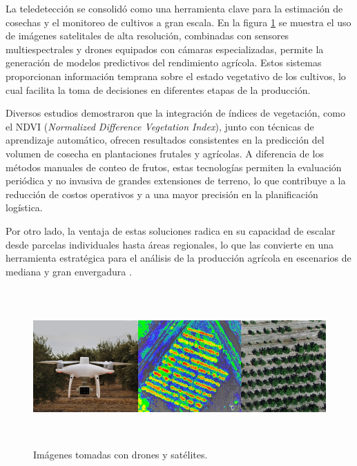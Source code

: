 La teledetección se consolidó como una herramienta clave para la estimación de cosechas y el monitoreo de cultivos a gran escala. En la figura \ref{fig:drones_en_cultivos} se muestra el uso de imágenes satelitales de alta resolución, combinadas con sensores multiespectrales y drones equipados con cámaras especializadas, permite la generación de modelos predictivos del rendimiento agrícola. Estos sistemas proporcionan información temprana sobre el estado vegetativo de los cultivos, lo cual facilita la toma de decisiones en diferentes etapas de la producción.

Diversos estudios demostraron que la integración de índices de vegetación, como el NDVI (\textit{Normalized Difference Vegetation Index}), junto con técnicas de aprendizaje automático, ofrecen resultados consistentes en la predicción del volumen de cosecha en plantaciones frutales y agrícolas. A diferencia de los métodos manuales de conteo de frutos, estas tecnologías permiten la evaluación periódica y no invasiva de grandes extensiones de terreno, lo que contribuye a la reducción de costos operativos y a una mayor precisión en la planificación logística.

Por otro lado, la ventaja de estas soluciones radica en su capacidad de escalar desde parcelas individuales hasta áreas regionales, lo que las convierte en una herramienta estratégica para el análisis de la producción agrícola en escenarios de mediana y gran envergadura \citep{Hobart2025}.

\vspace{1cm}
\begin{figure}[htbp]
	\centering
	\includegraphics[width=1\textwidth, height=6cm]{./Figures/drones_en_cultivos.jpg}
	\caption{Imágenes tomadas con drones y satélites\protect\footnotemark.}
	\label{fig:drones_en_cultivos}
\end{figure}
\vspace{1cm}


